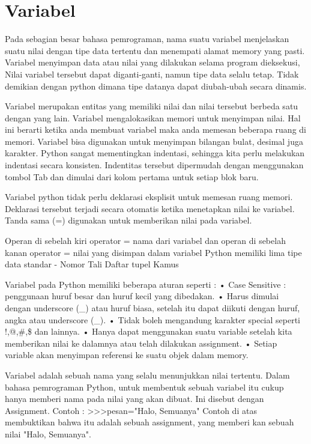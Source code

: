 
\section{Variabel}
Pada sebagian besar bahasa pemrograman, nama suatu variabel
menjelaskan suatu nilai dengan tipe data tertentu 
dan menempati alamat memory yang pasti.
Variabel menyimpan data atau nilai yang dilakukan selama program dieksekusi,
Nilai variabel tersebut dapat diganti-ganti, namun tipe data selalu tetap.
Tidak demikian dengan python dimana tipe datanya dapat diubah-ubah
secara dinamis\cite{suparno2013komputasi}.

Variabel merupakan entitas yang memiliki nilai dan nilai tersebut berbeda satu dengan yang lain. Variabel mengalokasikan memori untuk menyimpan nilai.
Hal ini berarti ketika anda membuat variabel maka anda memesan beberapa ruang di memori. 
Variabel bisa digunakan untuk menyimpan bilangan bulat, desimal juga karakter.
Python sangat mementingkan indentasi, sehingga kita perlu melakukan indentasi secara konsisten. 
Indentitas tersebut dipermudah dengan menggunakan tombol Tab dan dimulai dari kolom pertama untuk setiap blok baru.\cite{santoso2009bahasa}

Variabel python tidak perlu deklarasi eksplisit untuk memesan ruang memori. Deklarasi tersebut terjadi secara otomatis ketika menetapkan nilai ke variabel.
Tanda sama (=) digunakan untuk memberikan nilai pada variabel.

Operan di sebelah kiri operator =  nama dari variabel dan operan di sebelah kanan operator = nilai yang disimpan dalam variabel
Python memiliki lima tipe data standar -
Nomor
Tali
Daftar
tupel
Kamus


Variabel pada Python memiliki beberapa aturan seperti :
•	Case Sensitive : penggunaan huruf besar dan huruf kecil yang dibedakan.
•	Harus dimulai dengan underscore (_) atau huruf biasa, setelah itu dapat diikuti dengan huruf, angka atau underscore (_).
•	Tidak boleh mengandung karakter special seperti !,@,\#,\$ dan lainnya.
•	Hanya dapat menggunakan suatu variable setelah kita memberikan nilai ke dalamnya atau telah dilakukan assignment.
•	Setiap variable akan menyimpan referensi ke suatu objek dalam memory.\cite{santoso2009bahasa}


Variabel adalah sebuah nama yang selalu menunjukkan nilai tertentu. Dalam bahasa pemrograman Python, untuk membentuk sebuah variabel itu cukup hanya memberi nama pada nilai yang akan dibuat. Ini disebut dengan Assignment.
Contoh : 
>>>pesan="Halo, Semuanya"
Contoh di atas membuktikan bahwa itu adalah sebuah assignment, yang memberi kan sebuah nilai "Halo, Semuanya".\cite{Utami2004logika}

